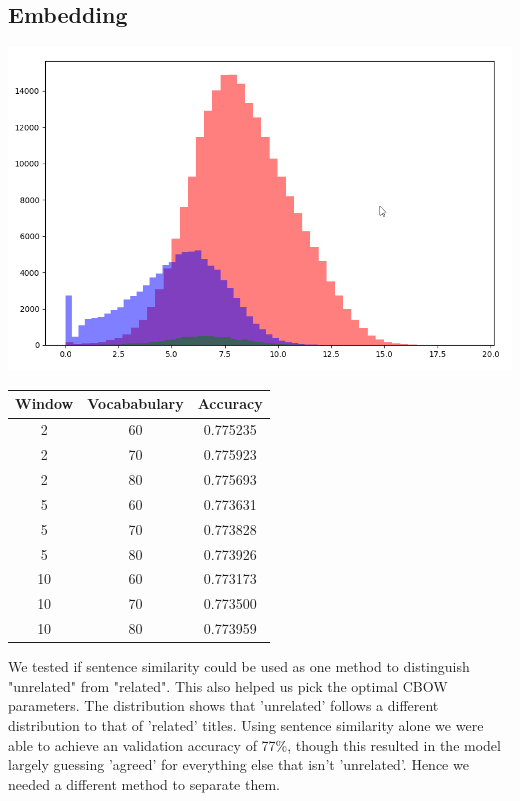 \documentclass[a4paper, 12pt]{article}
\newenvironment{Figure}
  {\par\medskip\noindent\minipage{\linewidth}}
  {\endminipage\par\medskip}
\begin{document}
\begin{multicols}{2}
        \subsection{Embedding}
        \begin{Figure}
            \centering
            \includegraphics[width=\linewidth]{images/embedding_dist.png}
            \label{embed_dist}
        \end{Figure}
        \begin{center}
                \begin{tabular}{ccc}
                    Window & Vocababulary& Accuracy \\
                    \hline
                    2 & 60 & 0.775235 \\
                    2 & 70 & 0.775923 \\
                    2 & 80 & 0.775693 \\
                    \hline
                    5 & 60 & 0.773631 \\
                    5 & 70 & 0.773828 \\
                    5 & 80 & 0.773926 \\
                    \hline
                    10 & 60 & 0.773173 \\
                    10 & 70 & 0.773500 \\
                    10 & 80 & 0.773959 \\
                \end{tabular}
        \end{center}
        
        We tested if sentence similarity could be used as one method to distinguish "unrelated" from "related". This also helped us pick the optimal CBOW parameters. The distribution shows that 'unrelated' follows a different distribution to that of 'related' titles. Using sentence similarity alone we were able to achieve an validation accuracy of 77\%, though this resulted in the model largely guessing 'agreed' for everything else that isn't 'unrelated'. Hence we needed a different method to separate them.
        
    \end{multicols}
\end{document}

